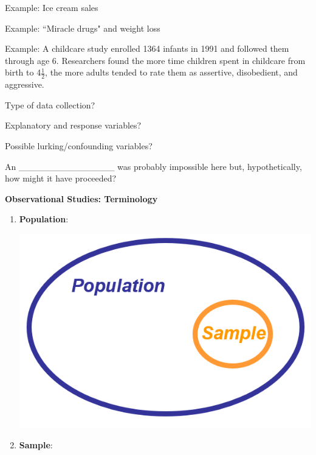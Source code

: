 \documentclass[11pt,letterpaper,twoside]{article}
\begin{document}
Example: Ice cream sales \vspace{150pt}

Example: ``Miracle drugs" and weight loss

\newpage

Example: A childcare study enrolled 1364 infants in 1991 and followed them through age 6. Researchers found the more time children spent in childcare from birth to 4{\footnotesize $\frac{1}{2}$},  the more adults tended to rate them as assertive, disobedient, and aggressive. \vspace{6pt}

Type of data collection? \vspace{30pt}

Explanatory and response variables? \vspace{30pt}

Possible lurking/confounding variables? \vspace{120pt}

An \_\_\_\_\_\_\_\_\_\_\_\_\_\_\_ was probably impossible here but, hypothetically, how might it have proceeded?

\newpage

{\bf Observational Studies: Terminology} \vspace{6pt}
\begin{enumerate}
\item {\bf Population}: \vspace{20pt}

\hspace{245pt}\includegraphics[scale=0.9]{images/pop.png}

\item {\bf Sample}: \vspace{150pt}

\end{enumerate}
\end{document}
